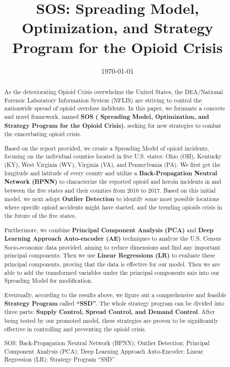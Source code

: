 \documentclass{mcmthesis}
\author{}
\begin{document}
\linespread{0.6}  %
\setlength{\parskip}{0.5\baselineskip}  %
\title{SOS: Spreading Model, Optimization, and Strategy Program for the Opioid Crisis}

\date{\today}
\begin{abstract}
	As the deteriorating Opioid Crisis overwhelms the United States, the DEA/National Forensic Laboratory Information System (NFLIS) are striving to control the nationwide spread of opioid overdose indidents. In this paper, we formuate a concrete and novel framework, named \textbf{SOS ( Spreading Model, Optimization, and Strategy Program for the Opioid Crisis)}, seeking for new strategies to combat the exacerbating opioid crisis.
	
	Based on the report provided, we create a Spreading Model of opioid incidents, focusing on the individual counties located in five U.S. states: Ohio (OH), Kentucky (KY), West Virginia (WV), Virginia (VA), and Pennsylvania (PA). We first get the longitude and latitude of every county and utilize a \textbf{Back-Propagation Neutral Network (BPNN)} to characterize the reported opioid and heroin incidents in and between the five states and their counties from 2010 to 2017. Based on this initial model, we next adopt \textbf{Outlier Detection} to identify some most possible locations where specific opioid accidents might have started, and the trending opioids crisis in the future of the five states. 
	
	Furthermore, we combine \textbf{Principal Component Analysis (PCA)} and \textbf{Deep Learning Approach Auto-encoder (AE)} techniques to analyze the U.S. Census Socio-economic data provided, aiming to reduce dimensions and find any important principal components. Then we use \textbf{Linear Regressions (LR)} to evaluate these principal components, proving that the data is effective for our model. Then we are able to add the transformed variables under the principal components axis into our Spreading Model for modification.
	
	Eventually, according to the results above, we figure out a comprehensive and feasible \textbf{Strategy Program} called \textbf{``SSD''}. The whole strategy program can be divided into three parts: \textbf{Supply Control, Spread Control, and Demand Control}. After being tested by our promoted model, these strategies are proven to be significantly effective in controlling and preventing the opioid crisis.
	
	\begin{keywords}
		SOS; Back-Propagation Neutral Network (BPNN); Outlier Detection; Principal Component Analysis (PCA); Deep Learning Approach Auto-Encoder; Linear Regression (LR);  Strategy Program ``SSD''
	\end{keywords}
\end{abstract}
\end{document}
